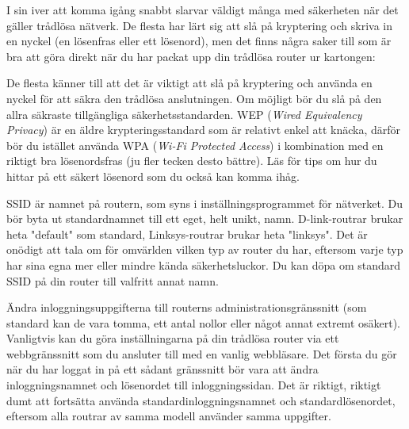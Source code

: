 \documentclass[a4paper,final]{memoir} %
\begin{document}

I sin iver att komma igång snabbt slarvar väldigt många med säkerheten när det gäller trådlösa nätverk. De flesta har lärt sig att slå på kryptering och skriva in en nyckel (en lösenfras eller ett lösenord), men det finns några saker till som är bra att göra direkt när du har packat upp din trådlösa router ur kartongen:

\begin{description}


\item[Slå på kryptering] De flesta känner till att det är viktigt att slå på kryptering och använda en nyckel för att säkra den trådlösa anslutningen. Om möjligt bör du slå på den allra säkraste tillgängliga säkerhetsstandarden. WEP (\textit{Wired Equivalency Privacy}) är en äldre krypteringsstandard som är relativt enkel att knäcka, därför bör du istället använda WPA (\textit{Wi-Fi Protected Access}) i kombination med en riktigt bra lösenordsfras (ju fler tecken desto bättre). Läs  för tips om hur du hittar på ett säkert lösenord som du också kan komma ihåg.


\item[Ändra SSID-namnet på routern] SSID är namnet på routern, som syns i inställningsprogrammet för nätverket. Du bör byta ut standardnamnet till ett eget, helt unikt, namn. D-link-routrar brukar heta "default" som standard, Linksys-routrar brukar heta "linksys". Det är onödigt att tala om för omvärlden vilken typ av router du har, eftersom varje typ har sina egna mer eller mindre kända säkerhetsluckor. Du kan döpa om standard SSID på din router till valfritt annat namn.

\item[Ange egna namn och lösenord] Ändra inloggningsuppgifterna till routerns administrationsgränssnitt (som standard kan de vara tomma, ett antal nollor eller något annat extremt osäkert). Vanligtvis kan du göra inställningarna på din trådlösa router via ett webbgränssnitt som du ansluter till med en vanlig webbläsare. Det första du gör när du har loggat in på ett sådant gränssnitt bör vara att ändra inloggningsnamnet och lösenordet till inloggningssidan. Det är riktigt, riktigt dumt att fortsätta använda standardinloggningsnamnet och standardlösenordet, eftersom alla routrar av samma modell använder samma uppgifter.

\end{description}
\end{document}
